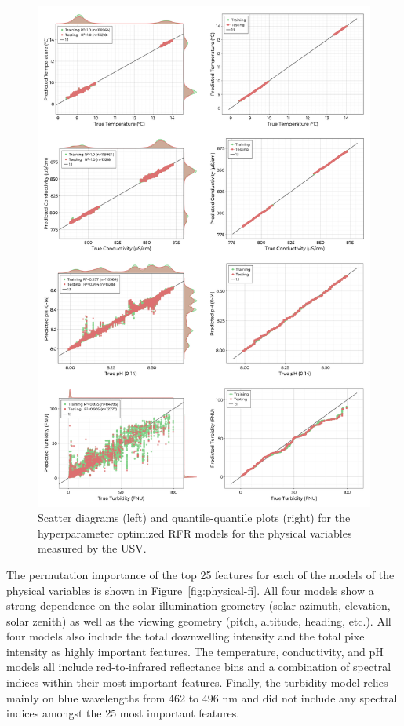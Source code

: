 \documentclass[remotesensing,article,submit,pdftex,moreauthors]{Definitions/mdpi}
\begin{document}
\begin{figure}[p]
\centering
\includegraphics[width=\columnwidth]{paper/figures/results/fits/physical-fitres.png}
\caption{Scatter diagrams (left) and quantile-quantile plots (right) for the hyperparameter optimized RFR models for the physical variables measured by the USV.\label{fig:physical-fit}}
\end{figure}  

The permutation importance of the top 25 features for each of the models of the physical variables is shown in Figure~\ref{fig:physical-fi}. All four models show a strong dependence on the solar illumination geometry (solar azimuth, elevation, solar zenith) as well as the viewing geometry (pitch, altitude, heading, etc.). All four models also include the total downwelling intensity and the total pixel intensity as highly important features. The temperature, conductivity, and pH models all include red-to-infrared reflectance bins and a combination of spectral indices within their most important features. Finally, the turbidity model relies mainly on blue wavelengths from 462 to 496 nm and did not include any spectral indices amongst the 25 most important features.
\end{document}
